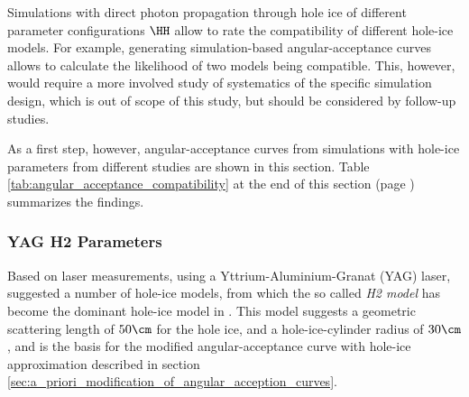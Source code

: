 \newcommand\ok{\ding{51}} %
\newcommand\same{\cellcolor{black!25}}
\newcommand\greyedout{\cellcolor{black!25}}
\newcommand\bad{\ding{55}}

\newcommand\clsimppc{\noun{clsim+ppc}}

Simulations with direct photon propagation through hole ice of different parameter configurations $\HH$ allow to rate the compatibility of different hole-ice models. For example, generating simulation-based angular-acceptance curves allows to calculate the likelihood of two models being compatible. This, however, would require a more involved study of systematics of the specific simulation design, which is out of scope of this study, but should be considered by follow-up studies.\followup

As a first step, however, angular-acceptance curves from simulations with hole-ice parameters from different studies are shown in this section. Table \ref{tab:angular_acceptance_compatibility} at the end of this section (page \pageref{tab:angular_acceptance_compatibility}) summarizes the findings.


%
%
%
%
%
%
\subsubsection{YAG H2 Parameters}
\label{sec:yag_h2_parameters}
Based on laser measurements, using a Yttrium-Aluminium-Granat (YAG) laser, \cite{holeicestudieswithyag} suggested a number of hole-ice models, from which the so called \textit{H2 model} has become the dominant hole-ice model in \icecube. This model suggests a geometric scattering length of $50\cm$ for the hole ice, and a hole-ice-cylinder radius of $30\cm$, and is the basis for the modified angular-acceptance curve with hole-ice approximation described in section \ref{sec:a_priori_modification_of_angular_acception_curves}.

